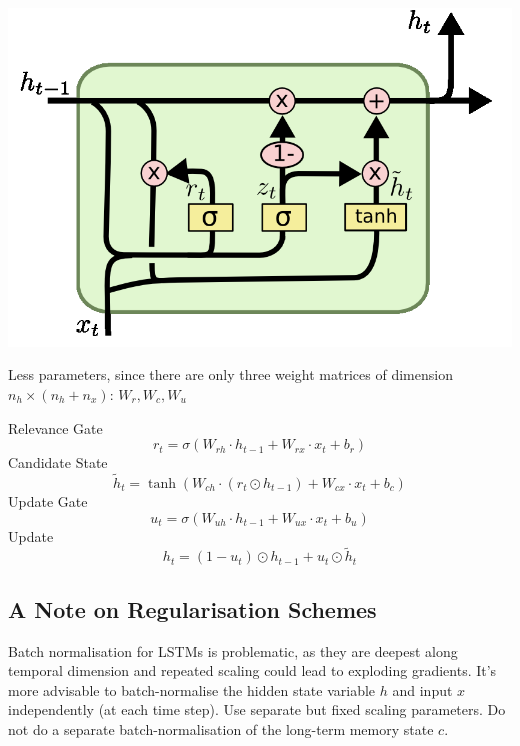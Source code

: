 \documentclass[11pt]{article}
\begin{document}
\vspace{1em}
\noindent
\begin{minipage}{0.3\linewidth}
	\begin{center}
		\includegraphics[width=\linewidth]{img/GRU_cell}
	\end{center}
	Less parameters, since there are only three weight matrices of dimension $n_h\times(n_h+n_x)$: $W_r, W_c, W_u$
\end{minipage}
\qquad
\begin{minipage}{0.6\linewidth}
	Relevance Gate
	\begin{equation*}
		r_t = \sigma(W_{rh}\cdot h_{t-1} + W_{rx}\cdot x_t + b_r)
	\end{equation*}
	\noindent
	Candidate State
	\begin{equation*}
		\tilde{h}_t = \tanh(W_{ch}\cdot (r_t\odot h_{t-1}) + W_{cx}\cdot x_t + b_c)
	\end{equation*}
	\noindent
	Update Gate
	\begin{equation*}
		u_t = \sigma(W_{uh}\cdot h_{t-1} + W_{ux}\cdot x_t + b_u)
	\end{equation*}
	\noindent
	Update
	\begin{equation*}
		h_t = (1 - u_t)\odot h_{t-1} + u_t \odot\tilde{h}_t
	\end{equation*}
\end{minipage}

\subsection{A Note on Regularisation Schemes}
Batch normalisation for LSTMs is problematic, as they are deepest along temporal dimension and repeated scaling could lead to exploding gradients. It's more advisable to batch-normalise the hidden state variable $h$ and input $x$ independently (at each time step). Use separate but fixed scaling parameters. Do not do a separate batch-normalisation of the long-term memory state $c$.
\end{document}
